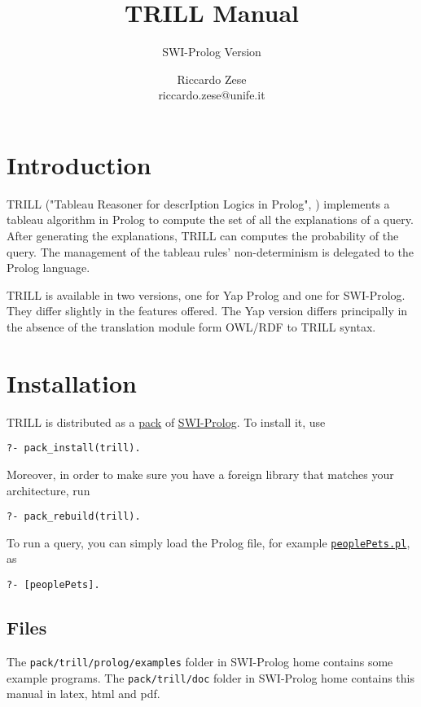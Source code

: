 \documentclass[a4paper,10pt]{scrartcl}
\begin{document}
\title{TRILL Manual}

\subtitle{SWI-Prolog Version}

\author{Riccardo Zese\\
riccardo.zese@unife.it}

\maketitle


\section{Introduction}


TRILL ("Tableau Reasoner for descrIption Logics in Prolog", \cite{ZesBelRig16-AMAI-IJ,Zese17-SSW-BK}) implements a tableau algorithm in
Prolog to compute the set of all the explanations of a query. After generating the explanations, 
TRILL can computes the probability of the query. The management of the tableau rules' non-determinism is delegated to the Prolog language.

TRILL is available in two versions, one for Yap Prolog and one for SWI-Prolog. They differ slightly in the features offered.
The Yap version differs principally in the absence of the translation module form OWL/RDF to TRILL syntax.

\section{Installation}
TRILL is distributed as a \href{http://www.swi-prolog.org/pack/list?p=trill}{pack} of \href{http://www.swi-prolog.org/}{SWI-Prolog}. To install it, use
\begin{verbatim}
?- pack_install(trill).
\end{verbatim}
Moreover, in order to make sure you have a foreign library that matches your architecture, run
\begin{verbatim}
?- pack_rebuild(trill). 
\end{verbatim}







To run a query, you can simply load the Prolog file, for example \href{http://trill.lamping.unife.it/example/trill/peoplePets.pl}{\texttt{peoplePets.pl}}, as
\begin{verbatim}
?- [peoplePets].
\end{verbatim}


\subsection{Files}
The \texttt{pack/trill/prolog/examples} folder in SWI-Prolog home contains some example programs.
The \texttt{pack/trill/doc} folder in SWI-Prolog home contains this manual in latex, html and pdf.
\end{document}
